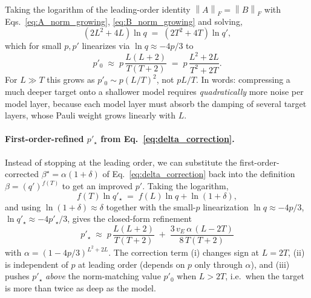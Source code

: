 \documentclass[%
 reprint,
superscriptaddress,
 amsmath,amssymb,
 aps,
]{revtex4-2}
\newcommand{\norm}[1]{\left\lVert#1\right\rVert}
\begin{document}
Taking the logarithm of the leading-order identity $\norm{A}_F = \norm{B}_F$ with Eqs.~\eqref{eq:A_norm_growing}, \eqref{eq:B_norm_growing} and solving,
\begin{equation}
    (2L^2+4L)\ln q \;=\; (2T^2+4T)\ln q',
\end{equation}
which for small $p,p'$ linearizes via $\ln q\approx -4p/3$ to
\begin{equation}
    \boxed{\;p'_0 \;\approx\; p\,\frac{L(L+2)}{T(T+2)} \;=\; p\,\frac{L^2+2L}{T^2+2T}.\;}
    \label{eq:pprime_match_new}
\end{equation}
For $L\gg T$ this grows as $p'_0\sim p(L/T)^2$, not $pL/T$. In words: compressing a much deeper target onto a shallower model requires \emph{quadratically} more noise per model layer, because each model layer must absorb the damping of several target layers, whose Pauli weight grows linearly with $L$.

\paragraph*{First-order-refined $p'_\star$ from Eq.~\eqref{eq:delta_correction}.}
Instead of stopping at the leading order, we can substitute the first-order-corrected $\beta^\star = \alpha(1+\delta)$ of Eq.~\eqref{eq:delta_correction} back into the definition $\beta = (q')^{f(T)}$ to get an improved $p'$. Taking the logarithm,
\begin{equation}
    f(T)\ln q'_\star \;=\; f(L)\ln q + \ln(1+\delta),
\end{equation}
and using $\ln(1+\delta)\approx\delta$ together with the small-$p$ linearization $\ln q\approx -4p/3$, $\ln q'_\star\approx -4p'_\star/3$, gives the closed-form refinement
\begin{equation}
    \boxed{\;p'_\star \;\approx\; p\,\frac{L(L+2)}{T(T+2)} \;+\; \frac{3\,v_E\,\alpha\,(L-2T)}{8\,T(T+2)}\;}
    \label{eq:pprime_first_order}
\end{equation}
with $\alpha = (1-4p/3)^{L^2+2L}$. The correction term (i) changes sign at $L=2T$, (ii) is independent of $p$ at leading order (depends on $p$ only through $\alpha$), and (iii) pushes $p'_\star$ \emph{above} the norm-matching value $p'_0$ when $L>2T$, i.e.\ when the target is more than twice as deep as the model.
\end{document}
